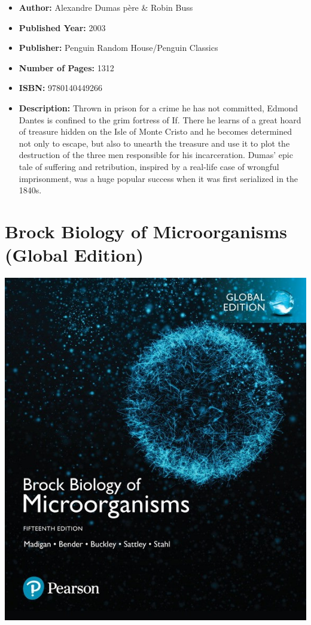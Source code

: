 \documentclass{tufte-handout}
\makeatletter
\newcommand{\varcaption}[2][0pt]{%
  \gsetlength{\@tufte@caption@vertical@offset}{-#1}%
  \gdef\@tufte@stored@varcaption{#2}%
}
\gdef\@tufte@stored@varcaption{} %
\makeatother
\begin{document}
\begin{itemize}
    \item[] \textbf{Author:} Alexandre Dumas père \& Robin Buss
    \item[] \textbf{Published Year:} 2003
    \item[] \textbf{Publisher:} Penguin Random House/Penguin Classics
    \item[] \textbf{Number of Pages:} 1312      
    \item[] \textbf{ISBN:} 9780140449266
    \item[] \textbf{Description:} Thrown in prison for a crime he has not committed, Edmond Dantes is confined to the grim fortress of If. There he learns of a great hoard of treasure hidden on the Isle of Monte Cristo and he becomes determined not only to escape, but also to unearth the treasure and use it to plot the destruction of the three men responsible for his incarceration. Dumas’ epic tale of suffering and retribution, inspired by a real-life case of wrongful imprisonment, was a huge popular success when it was first serialized in the 1840s.
\end{itemize}

\section*{Brock Biology of Microorganisms (Global Edition)}
\begin{marginfigure}[9\baselineskip]
   \includegraphics[width=\linewidth]{images/brock.jpeg}
   \varcaption{\href{https://www.pearson.com/nl/en_NL/higher-education/subject-catalogue/biology/Brock-Biology-of-Microorganisms-Madigan.html}{Publisher Link}, \href{https://www.amazon.com/Brock-Biology-Microorganisms-Madigan-Michael/dp/1292235101/}{Amazon Link}}
\end{marginfigure}
\end{document}
